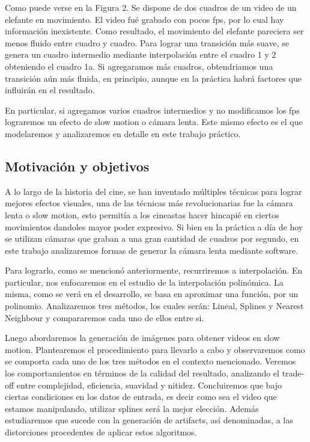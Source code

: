 Como puede verse en la Figura 2. Se dispone de dos cuadros de un video de un elefante en movimiento. El video fué grabado con pocos fps, por lo cual hay información inexistente. Como resultado, el movimiento del elefante pareciera ser menos fluido entre cuadro y cuadro. Para lograr una transición más suave, se genera un cuadro intermedio mediante interpolación entre el cuadro 1 y 2 obteniendo el cuadro 1a. Si agregaramos más cuadros, obtendriamos una transición aún más fluida, en principio, aunque en la práctica habrá factores que influirán en el resultado. 

En particular, si agregamos varios cuadros intermedios y no modificamos los fps lograremos un efecto de slow motion o cámara lenta. Este mismo efecto es el que modelaremos y analizaremos en detalle en este trabajo práctico.

\subsection{Motivación y objetivos}

A lo largo de la historia del cine, se han inventado múltiples técnicas para lograr mejores efectos visuales, una de las técnicas más revolucionarias fue la cámara lenta o slow motion, esto permitía a los cineastas hacer hincapié en ciertos movimientos dandoles mayor poder expresivo. Si bien en la práctica a día de hoy se utilizan cámaras que graban a una gran cantidad de cuadros por segundo, en este trabajo analizaremos formas de generar la cámara lenta mediante software.

Para lograrlo, como se mencionó anteriormente, recurriremos a interpolación.
En particular, nos enfocaremos en el estudio de la interpolación polinómica. 
La misma, como se verá en el desarrollo, se basa en aproximar una función, por un polinomio. Analizaremos tres métodos, los cuales serán:  Lineal, Splines y Nearest Neighbour y compararemos cada uno de ellos entre si.

Luego abordaremos la generación de imágenes para obtener videos en slow motion.
Plantearemos el procedimiento para llevarlo a cabo y observaremos como se comporta cada uno de los tres métodos en el contexto mencionado. Veremos los comportamientos en términos de la calidad del resultado, analizando el trade-off entre complejidad, eficiencia, suavidad y nitidez. Concluiremos que bajo ciertas condiciones en los datos de entrada, es decir como sea el video que estamos manipulando, utilizar splines será la mejor elección. 
Además estudiaremos que sucede con la generación de artifacts, así denominadas, a las distorciones procedentes de aplicar estos algoritmos.